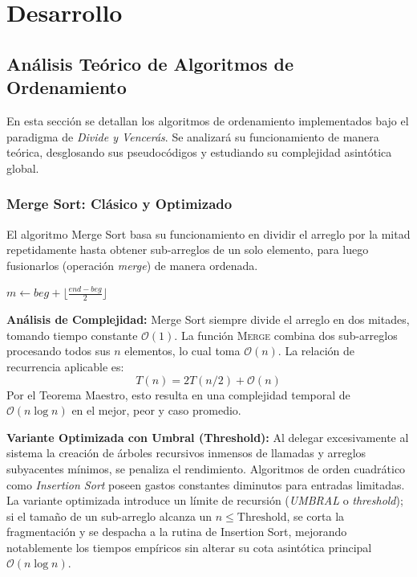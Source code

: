 \section{Desarrollo}
\label{sec:desarrollo}

\subsection{Análisis Teórico de Algoritmos de Ordenamiento}\label{sec:ordenamiento_dv}
En esta sección se detallan los algoritmos de ordenamiento implementados bajo el paradigma de \textit{Divide y Vencerás}. Se analizará su funcionamiento de manera teórica, desglosando sus pseudocódigos y estudiando su complejidad asintótica global.

\subsubsection{Merge Sort: Clásico y Optimizado}\label{sec:merge_sort}
El algoritmo Merge Sort basa su funcionamiento en dividir el arreglo por la mitad repetidamente hasta obtener sub-arreglos de un solo elemento, para luego fusionarlos (operación \textit{merge}) de manera ordenada.

\begin{algorithm}[H]
    \caption{Merge Sort Clásico $\triangleright$ $V[beg..end]$}
    \begin{algorithmic}[1]
            \State $m \gets beg + \lfloor \frac{end-beg}{2} \rfloor$
            \State {}
            \State {}
            \State {}
        \EndIf
        \EndProcedure
    \end{algorithmic}
\end{algorithm}

\textbf{Análisis de Complejidad:}
Merge Sort siempre divide el arreglo en dos mitades, tomando tiempo constante $\mathcal{O}(1)$. La función \textsc{Merge} combina dos sub-arreglos procesando todos sus $n$ elementos, lo cual toma $\mathcal{O}(n)$.
La relación de recurrencia aplicable es:
\[ T(n) = 2T(n/2) + \mathcal{O}(n) \]
Por el Teorema Maestro, esto resulta en una complejidad temporal de $\mathcal{O}(n \log n)$ en el mejor, peor y caso promedio.

\textbf{Variante Optimizada con Umbral (Threshold):}
Al delegar excesivamente al sistema la creación de árboles recursivos inmensos de llamadas y arreglos subyacentes mínimos, se penaliza el rendimiento. Algoritmos de orden cuadrático como \textit{Insertion Sort} poseen gastos constantes diminutos para entradas limitadas. La variante optimizada introduce un límite de recursión (\textit{UMBRAL} o \textit{threshold}); si el tamaño de un sub-arreglo alcanza un $n \le \text{Threshold}$, se corta la fragmentación y se despacha a la rutina de Insertion Sort, mejorando notablemente los tiempos empíricos sin alterar su cota asintótica principal $\mathcal{O}(n \log n)$.

